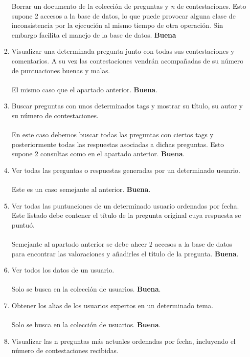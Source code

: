 \documentclass{article}
\begin{document}
\begin{enumerate}
      Borrar un documento de la colección de preguntas y \emph{n} de contestaciones.
      Esto supone 2 accesos a la base de datos, lo que puede provocar alguna clase de inconsistencia
      por la ejecución al mismo tiempo de otra operación. Sin embargo facilita el manejo de
      la base de datos. \textbf{Buena}
      \item Visualizar una determinada pregunta junto con todas sus contestaciones
      y comentarios. A su vez las contestaciones vendrán acompañadas de su
      número de puntuaciones buenas y malas. \\ \\
      El mismo caso que el apartado anterior. \textbf{Buena}.
      \item Buscar preguntas con unos determinados tags y mostrar su título, su autor
      y su número de contestaciones. \\ \\
      En este caso debemos buscar todas las preguntas con ciertos tags y posteriormente
      todas las respuestas asociadas a dichas preguntas. Esto supone 2 consultas como 
      en el apartado anterior. \textbf{Buena}.
      \item Ver todas las preguntas o respuestas generadas por un determinado usuario. \\ \\
      Este es un caso semejante al anterior. \textbf{Buena}.
      \item Ver todas las puntuaciones de un determinado usuario ordenadas por fecha.
      Este listado debe contener el título de la pregunta original cuya respuesta
      se puntuó. \\ \\
      Semejante al apartado anterior se debe ahcer 2 accesos a la base de datos para 
      encontrar las valoraciones y añadirles el título de la pregunta. \textbf{Buena}.
      \item Ver todos los datos de un usuario.\\ \\
      Solo se busca en la colección de usuarios. \textbf{Buena}.
      \item Obtener los alias de los usuarios expertos en un determinado tema.\\ \\
      Solo se busca en la colección de usuarios. \textbf{Buena}.
      \item Visualizar las n preguntas más actuales ordenadas por fecha, incluyendo
      el número de contestaciones recibidas.\\ \\

\end{enumerate}
\end{document}
